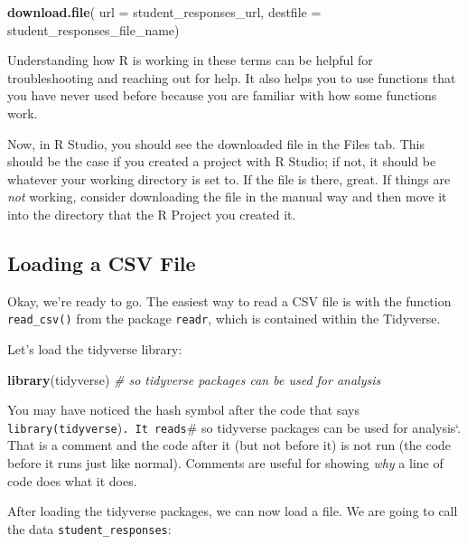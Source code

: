 \documentclass[]{book}
\newenvironment{Shaded}{\begin{snugshade}}{\end{snugshade}}
\newcommand{\KeywordTok}[1]{\textcolor[rgb]{0.13,0.29,0.53}{\textbf{#1}}}
\newcommand{\DataTypeTok}[1]{\textcolor[rgb]{0.13,0.29,0.53}{#1}}
\newcommand{\CommentTok}[1]{\textcolor[rgb]{0.56,0.35,0.01}{\textit{#1}}}
\newcommand{\NormalTok}[1]{#1}
\begin{document}
\begin{Shaded}
\begin{Highlighting}[]
\KeywordTok{download.file}\NormalTok{(}
    \DataTypeTok{url =}\NormalTok{ student_responses_url,}
    \DataTypeTok{destfile =}\NormalTok{ student_responses_file_name)}
\end{Highlighting}
\end{Shaded}

Understanding how R is working in these terms can be helpful for
troubleshooting and reaching out for help. It also helps you to use
functions that you have never used before because you are familiar with
how some functions work.

Now, in R Studio, you should see the downloaded file in the Files tab.
This should be the case if you created a project with R Studio; if not,
it should be whatever your working directory is set to. If the file is
there, great. If things are \emph{not} working, consider downloading the
file in the manual way and then move it into the directory that the R
Project you created it.

\subsection{Loading a CSV File}\label{loading-a-csv-file}

Okay, we're ready to go. The easiest way to read a CSV file is with the
function \texttt{read\_csv()} from the package \texttt{readr}, which is
contained within the Tidyverse.

Let's load the tidyverse library:

\begin{Shaded}
\begin{Highlighting}[]
\KeywordTok{library}\NormalTok{(tidyverse) }\CommentTok{# so tidyverse packages can be used for analysis}
\end{Highlighting}
\end{Shaded}

You may have noticed the hash symbol after the code that says
\texttt{library(tidyverse})\texttt{.\ It\ reads}\# so tidyverse packages
can be used for analysis`. That is a comment and the code after it (but
not before it) is not run (the code before it runs just like normal).
Comments are useful for showing \emph{why} a line of code does what it
does.

After loading the tidyverse packages, we can now load a file. We are
going to call the data \texttt{student\_responses}:
\end{document}
